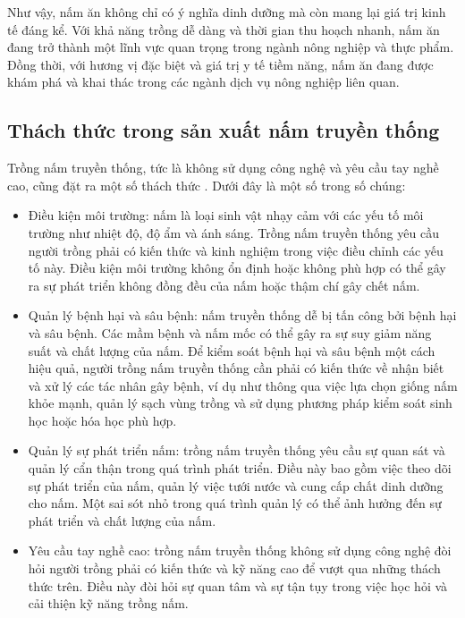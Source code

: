 Như vậy, nấm ăn không chỉ có ý nghĩa dinh dưỡng mà còn mang lại giá trị kinh tế đáng kể. Với khả năng trồng dễ dàng và thời gian thu hoạch nhanh, nấm ăn đang trở thành một lĩnh vực quan trọng trong ngành nông nghiệp và thực phẩm. Đồng thời, với hương vị đặc biệt và giá trị y tế tiềm năng, nấm ăn đang được khám phá và khai thác trong các ngành dịch vụ nông nghiệp liên quan.

\subsection{Thách thức trong sản xuất nấm truyền thống}

Trồng nấm truyền thống, tức là không sử dụng công nghệ và yêu cầu tay nghề cao, cũng đặt ra một số thách thức \cite{hoan2022Aug}. Dưới đây là một số trong số chúng:

\begin{itemize}
	\item Điều kiện môi trường: nấm là loại sinh vật nhạy cảm với các yếu tố môi trường như nhiệt độ, độ ẩm và ánh sáng. Trồng nấm truyền thống yêu cầu người trồng phải có kiến thức và kinh nghiệm trong việc điều chỉnh các yếu tố này. Điều kiện môi trường không ổn định hoặc không phù hợp có thể gây ra sự phát triển không đồng đều của nấm hoặc thậm chí gây chết nấm.
	
	\item Quản lý bệnh hại và sâu bệnh: nấm truyền thống dễ bị tấn công bởi bệnh hại và sâu bệnh. Các mầm bệnh và nấm mốc có thể gây ra sự suy giảm năng suất và chất lượng của nấm. Để kiểm soát bệnh hại và sâu bệnh một cách hiệu quả, người trồng nấm truyền thống cần phải có kiến thức về nhận biết và xử lý các tác nhân gây bệnh, ví dụ như thông qua việc lựa chọn giống nấm khỏe mạnh, quản lý sạch vùng trồng và sử dụng phương pháp kiểm soát sinh học hoặc hóa học phù hợp.
	\item Quản lý sự phát triển nấm: trồng nấm truyền thống yêu cầu sự quan sát và quản lý cẩn thận trong quá trình phát triển. Điều này bao gồm việc theo dõi sự phát triển của nấm, quản lý việc tưới nước và cung cấp chất dinh dưỡng cho nấm. Một sai sót nhỏ trong quá trình quản lý có thể ảnh hưởng đến sự phát triển và chất lượng của nấm.
	\item Yêu cầu tay nghề cao: trồng nấm truyền thống không sử dụng công nghệ đòi hỏi người trồng phải có kiến thức và kỹ năng cao để vượt qua những thách thức trên. Điều này đòi hỏi sự quan tâm và sự tận tụy trong việc học hỏi và cải thiện kỹ năng trồng nấm.
	
\end{itemize}

